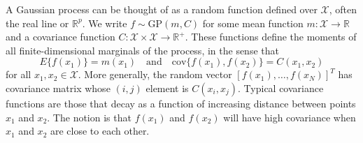 \documentclass[10pt]{article}
\begin{document}
    A Gaussian process can be thought of as a random function defined over $\mathcal{X}$, often the real line or $\mathbb{R}^p$.  We write $f \sim \mbox{GP}(m, C)$ for some mean function $m: \mathcal{X} \rightarrow \mathbb{R}$ and a covariance function $C: \mathcal{X} \times \mathcal{X} \rightarrow \mathbb{R}^+$.  These functions define the moments of all finite-dimensional marginals of the process, in the sense that
    $$
    E\{ f(x_1) \} = m(x_1) \quad \mbox{and} \quad \mbox{cov}\{f(x_1), f(x_2) \} = C(x_1, x_2)
    $$
    for all $x_1, x_2 \in \mathcal{X}$.  More generally, the random vector $[f(x_1), \ldots, f(x_N)]^T$ has covariance matrix whose $(i,j)$ element is $C(x_i, x_j)$.  Typical covariance functions are those that decay as a function of increasing distance between points $x_1$ and $x_2$.  The notion is that $f(x_1)$ and $f(x_2)$ will have high covariance when $x_1$ and $x_2$ are close to each other.
\end{document}
